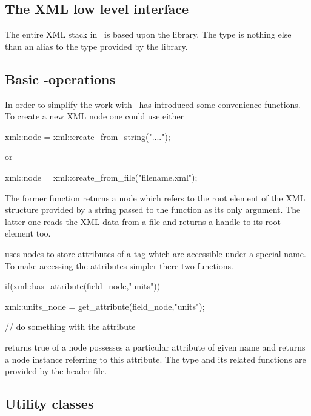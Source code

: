 \subsection{The XML low level interface}\label{sec:xml:lowlevel}

The entire XML stack in \libpniio\ is based upon the 
 library. The  type is 
nothing else than an alias to the  type provided by the 
 library.

\subsection{Basic -operations}

In order to simplify the work with  \libpniio\ has
introduced some convenience functions. 
To create a new XML node one could use either 
\begin{cppcode}
xml::node = xml::create_from_string("....");
\end{cppcode}
or
\begin{cppcode}
xml::node = xml::create_from_file("filename.xml");
\end{cppcode}
The former function returns a node which refers to the root element of the 
XML structure provided by a string passed to the function as its only argument. 
The latter one reads the XML data from a file and returns a handle to its 
root element too.

 uses nodes to store attributes of a tag which are 
accessible under a special name. To make accessing the attributes simpler 
there two functions.  
\begin{cppcode}
if(xml::has_attribute(field_node,"units"))
{
    xml::units_node = get_attribute(field_node,"units");

    // do something with the attribute
}
\end{cppcode}
 returns true of a node possesses a particular attribute of
given name and  returns a node instance referring to this 
attribute. 
The  type and its related functions are provided by the
 header file.

\subsection{Utility classes}

